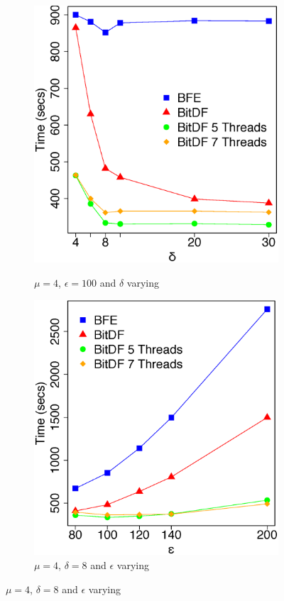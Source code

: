 {\begin{figure}[h!]
    \centering
    \caption{Results varying $\delta$ and $\epsilon$ for BerlinMOD dataset}
    \begin{subfigure}[t]{0.49\textwidth}
        \caption{$\mu = 4$, $\epsilon = 100$ and $\delta$ varying}
        \includegraphics[width=\textwidth]{images/BerlinMOD_complete_varying_l.eps}
        \label{fig:berlinmod_complete_vary_l}
    \end{subfigure}
    \begin{subfigure}[t]{0.49\textwidth}
        \caption{$\mu = 4$, $\delta = 8$ and $\epsilon$ varying}
        \includegraphics[width=\textwidth]{images/BerlinMOD_complete_varying_g.eps}

\end{subfigure}
\end{figure}}
